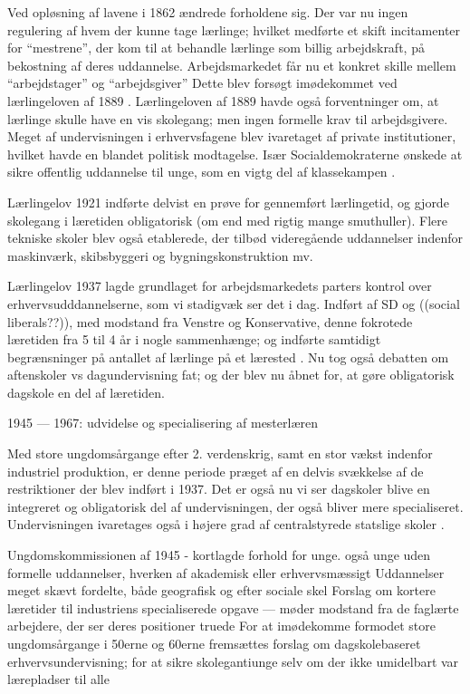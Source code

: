 Ved opløsning af lavene i 1862 ændrede forholdene sig.
Der var nu ingen regulering af hvem der kunne tage lærlinge; hvilket medførte et skift incitamenter for  “mestrene”, der kom til at behandle lærlinge som billig arbejdskraft, på bekostning af deres uddannelse.
Arbejdsmarkedet får nu et konkret skille mellem “arbejdstager” og “arbejdsgiver”
Dette blev forsøgt imødekommet ved lærlingeloven af 1889 \autocite[s. 25]{bondergaardHistoricalEmergenceKey2014}.
Lærlingeloven af 1889 havde også forventninger om, at lærlinge skulle have en vis skolegang; men ingen formelle krav til arbejdsgivere.
Meget af undervisningen i erhvervsfagene blev ivaretaget af private institutioner, hvilket havde en blandet politisk modtagelse.
Især Socialdemokraterne ønskede at sikre offentlig uddannelse til unge, som en vigtg del af klassekampen \autocite[s. 26f]{bondergaardHistoricalEmergenceKey2014}.

Lærlingelov 1921 indførte delvist en prøve for gennemført lærlingetid, og gjorde skolegang i læretiden obligatorisk (om end med rigtig mange smuthuller).
Flere tekniske skoler blev også etablerede, der tilbød videregående uddannelser indenfor maskinværk, skibsbyggeri og bygningskonstruktion mv. \autocite[s. 27f]{bondergaardHistoricalEmergenceKey2014}

Lærlingelov 1937 lagde grundlaget for arbejdsmarkedets parters kontrol over erhvervsudddannelserne, som vi stadigvæk ser det i dag.
Indført af SD og ((social liberals??)), med modstand fra Venstre og Konservative, denne fokrotede læretiden fra 5 til 4 år i nogle sammenhænge; og indførte samtidigt begrænsninger på antallet af lærlinge på et lærested \autocite[s. 29f]{bondergaardHistoricalEmergenceKey2014}.
Nu tog også debatten om aftenskoler vs dagundervisning fat; og der blev nu åbnet for, at gøre obligatorisk dagskole en del af læretiden.

1945 — 1967: udvidelse og specialisering af mesterlæren

Med store ungdomsårgange efter 2. verdenskrig, samt en stor vækst indenfor industriel produktion, er denne periode præget af en delvis svækkelse af de restriktioner der blev indført i 1937.
Det er også nu vi ser dagskoler blive en integreret og obligatorisk del af undervisningen, der også bliver mere specialiseret.
Undervisningen ivaretages også i højere grad af centralstyrede statslige skoler \autocite[s. 35]{bondergaardHistoricalEmergenceKey2014}.

Ungdomskommissionen af 1945 - kortlagde forhold for unge.
også unge uden formelle uddannelser, hverken af akademisk eller erhvervsmæssigt
Uddannelser meget skævt fordelte, både geografisk og efter sociale skel
Forslag om kortere læretider til industriens specialiserede opgave --- møder modstand fra de faglærte arbejdere, der ser deres positioner truede
For at imødekomme formodet store ungdomsårgange i 50erne og 60erne fremsættes forslag om dagskolebaseret erhvervsundervisning; for at sikre skolegantiunge selv om der ikke umidelbart var lærepladser til alle


